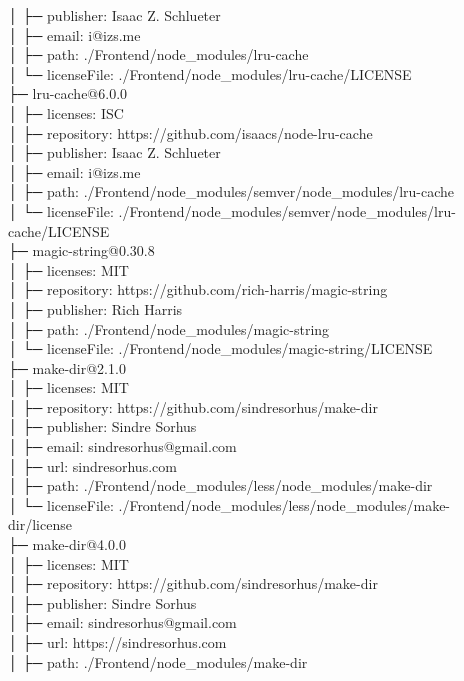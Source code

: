 │  ├─ publisher: Isaac Z. Schlueter\\
│  ├─ email: i@izs.me\\
│  ├─ path: ./Frontend/node\_modules/lru-cache\\
│  └─ licenseFile: ./Frontend/node\_modules/lru-cache/LICENSE\\
├─ lru-cache@6.0.0\\
│  ├─ licenses: ISC\\
│  ├─ repository: https://github.com/isaacs/node-lru-cache\\
│  ├─ publisher: Isaac Z. Schlueter\\
│  ├─ email: i@izs.me\\
│  ├─ path: ./Frontend/node\_modules/semver/node\_modules/lru-cache\\
│  └─ licenseFile: ./Frontend/node\_modules/semver/node\_modules/lru-cache/LICENSE\\
├─ magic-string@0.30.8\\
│  ├─ licenses: MIT\\
│  ├─ repository: https://github.com/rich-harris/magic-string\\
│  ├─ publisher: Rich Harris\\
│  ├─ path: ./Frontend/node\_modules/magic-string\\
│  └─ licenseFile: ./Frontend/node\_modules/magic-string/LICENSE\\
├─ make-dir@2.1.0\\
│  ├─ licenses: MIT\\
│  ├─ repository: https://github.com/sindresorhus/make-dir\\
│  ├─ publisher: Sindre Sorhus\\
│  ├─ email: sindresorhus@gmail.com\\
│  ├─ url: sindresorhus.com\\
│  ├─ path: ./Frontend/node\_modules/less/node\_modules/make-dir\\
│  └─ licenseFile: ./Frontend/node\_modules/less/node\_modules/make-dir/license\\
├─ make-dir@4.0.0\\
│  ├─ licenses: MIT\\
│  ├─ repository: https://github.com/sindresorhus/make-dir\\
│  ├─ publisher: Sindre Sorhus\\
│  ├─ email: sindresorhus@gmail.com\\
│  ├─ url: https://sindresorhus.com\\
│  ├─ path: ./Frontend/node\_modules/make-dir\\
